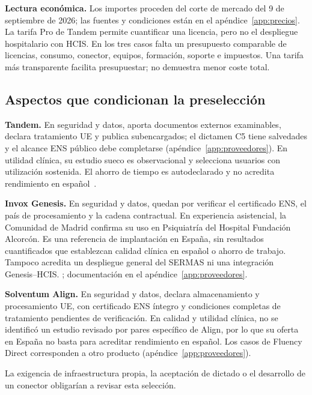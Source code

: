 \textbf{Lectura económica.} Los importes proceden del corte de mercado del 9 de septiembre de 2026; las fuentes y condiciones están en el apéndice~\ref{app:precios}. La tarifa Pro de Tandem permite cuantificar una licencia, pero no el despliegue hospitalario con HCIS. En los tres casos falta un presupuesto comparable de licencias, consumo, conector, equipos, formación, soporte e impuestos. Una tarifa más transparente facilita presupuestar; no demuestra menor coste total.

\subsection{Aspectos que condicionan la preselección}
\textbf{Tandem.} En seguridad y datos, aporta documentos externos examinables, declara tratamiento UE y publica subencargados; el dictamen C5 tiene salvedades y el alcance ENS público debe completarse (apéndice~\ref{app:proveedores}). En utilidad clínica, su estudio sueco es observacional y selecciona usuarios con utilización sostenida. El ahorro de tiempo es autodeclarado y no acredita rendimiento en español~\cite{C7S8N9NA}.

\textbf{Invox Genesis.} En seguridad y datos, quedan por verificar el certificado ENS, el país de procesamiento y la cadena contractual. En experiencia asistencial, la Comunidad de Madrid confirma su uso en Psiquiatría del Hospital Fundación Alcorcón. Es una referencia de implantación en España, sin resultados cuantificados que establezcan calidad clínica en español o ahorro de trabajo. Tampoco acredita un despliegue general del SERMAS ni una integración Genesis--HCIS. ; documentación en el apéndice~\ref{app:proveedores}.

\textbf{Solventum Align.} En seguridad y datos, declara almacenamiento y procesamiento UE, con certificado ENS íntegro y condiciones completas de tratamiento pendientes de verificación. En calidad y utilidad clínica, no se identificó un estudio revisado por pares específico de Align, por lo que su oferta en España no basta para acreditar rendimiento en español. Los casos de Fluency Direct corresponden a otro producto (apéndice~\ref{app:proveedores}).

La exigencia de infraestructura propia, la aceptación de dictado o el desarrollo de un conector obligarían a revisar esta selección.

